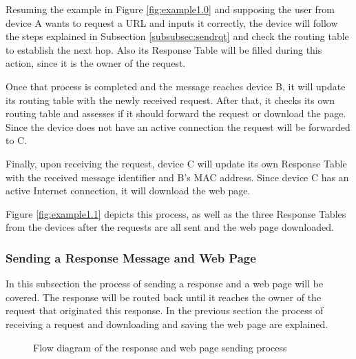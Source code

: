 Resuming the example in Figure \ref{fig:example1.0} and supposing the user from device A wants to request a \gls{URL} and inputs it correctly, the device will follow the steps explained in Subsection \ref{subsubsec:sendrqt} and check the routing table to establish the next hop. Also its Response Table will be filled during this action, since it is the owner of the request.

Once that process is completed and the message reaches device B, it will update its routing table with the newly received request. After that, it checks its own routing table and assesses if it should forward the request or download the page. Since the device does not have an active connection the request will be forwarded to C.

Finally, upon receiving the request, device C will update its own Response Table with the received message identifier and B's \gls{MAC} address. Since device C has an active Internet connection, it will download the web page.

Figure \ref{fig:example1.1} depicts this process, as well as the three Response Tables from the devices after the requests are all sent and the web page downloaded.

\subsubsection{Sending a Response Message and Web Page}
\label{subsubsec:sendrsp}

In this subsection the process of sending a response and a web page will be covered. The response will be routed back until it reaches the owner of the request that originated this response. In the previous section the process of receiving a request and downloading and saving the web page are explained.

\begin{figure}[ht]
	\noindent{}
	\caption{\label{fig:rspsendflux} Flow diagram of the response and web page sending process}
\end{figure}

